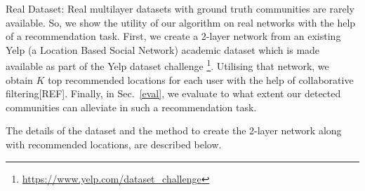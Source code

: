 
 \item Real Dataset: Real multilayer datasets with ground truth communities are rarely available.
 So, we show the utility of our algorithm on real networks with the help of a recommendation task.
 First, we create a 2-layer network from an existing Yelp (a Location Based Social Network) academic dataset
 which is made available as part of the Yelp dataset challenge
 \footnote{\url{https://www.yelp.com/dataset\_challenge}}. Utilising that network, we obtain $K$ top recommended locations
 for each user with the help of collaborative filtering[REF]. Finally, in Sec.~\ref{eval}, we evaluate to what extent
 our detected communities can alleviate in such a recommendation task.

 The details of the dataset and the method to create the 2-layer network along with recommended locations, are described below.

